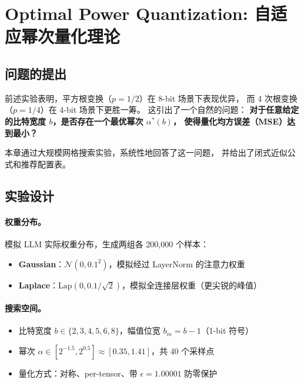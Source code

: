 
\section{Optimal Power Quantization: 自适应幂次量化理论}

\subsection{问题的提出}

前述实验表明，平方根变换（$p=1/2$）在 8-bit 场景下表现优异，
而 4 次根变换（$p=1/4$）在 4-bit 场景下更胜一筹。
这引出了一个自然的问题：
\textbf{对于任意给定的比特宽度 $b$，是否存在一个最优幂次 $\alpha^*(b)$，
使得量化均方误差（MSE）达到最小？}

本章通过大规模网格搜索实验，系统性地回答了这一问题，
并给出了闭式近似公式和推荐配置表。

\subsection{实验设计}

\paragraph{权重分布。}
模拟 LLM 实际权重分布，生成两组各 200,000 个样本：
\begin{itemize}
\item \textbf{Gaussian}：$\mathcal{N}(0, 0.1^2)$，模拟经过 LayerNorm 的注意力权重
\item \textbf{Laplace}：$\text{Lap}(0, 0.1/\sqrt{2})$，模拟全连接层权重（更尖锐的峰值）
\end{itemize}

\paragraph{搜索空间。}
\begin{itemize}
\item 比特宽度 $b \in \{2, 3, 4, 5, 6, 8\}$，幅值位宽 $b_m = b - 1$（1-bit 符号）
\item 幂次 $\alpha \in [2^{-1.5}, 2^{0.5}] \approx [0.35, 1.41]$，共 40 个采样点
\item 量化方式：对称、per-tensor、带 $\epsilon=1.00001$ 防零保护
\end{itemize}

